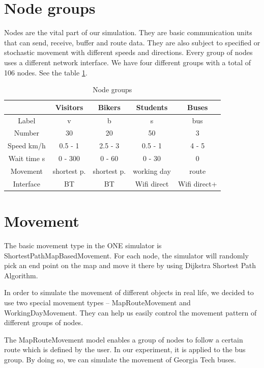 \documentclass[conference]{IEEEtran}
\begin{document}
\section{Node groups}

Nodes are the vital part of our simulation. They are basic communication units that can send, receive, buffer and route data. They are also subject to specified or stochastic movement with different speeds and directions. Every group of nodes uses a different network interface. We have four different groups with a total of 106 nodes. See the table \ref{node_groups}.

\begin{table}[!t]
\renewcommand{\arraystretch}{1.5}
\caption{Node groups}
\label{node_groups}
\centering
\begin{tabular}{|c||c||c||c||c|}
\hline
 & Visitors & Bikers & Students & Buses\\
\hline
Label & v & b & s & bus\\
\hline
Number & 30 & 20 & 50 & 3\\
\hline
Speed km/h & 0.5 - 1 & 2.5 - 3 & 0.5 - 1 & 4 - 5\\
\hline
Wait time s & 0 - 300 & 0 - 60 & 0 - 30 & 0\\
\hline
Movement & shortest p. & shortest p. & working day & route\\
\hline
Interface & BT & BT & Wifi direct & Wifi direct+\\
\hline
\end{tabular}
\end{table}

\section{Movement}

The basic movement type in the ONE simulator is ShortestPathMapBasedMovement. For each node, the simulator will randomly pick an end point on the map and move it there by using Dijkstra Shortest Path Algorithm.

In order to simulate the movement of different objects in real life, we decided to use two special movement types -- MapRouteMovement and WorkingDayMovement. They can help us easily control the movement pattern of different groups of nodes.

The MapRouteMovement model enables a group of nodes to follow a certain route which is defined by the user. In our experiment, it is applied to the bus group. By doing so, we can simulate the movement of Georgia Tech buses.
\end{document}
